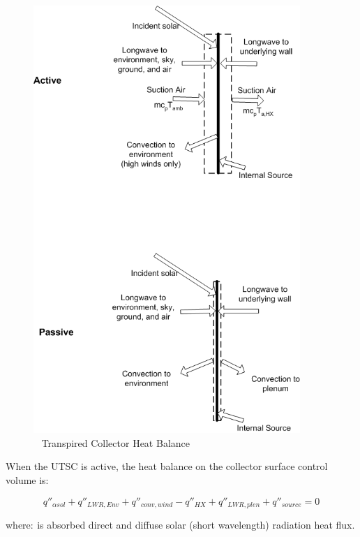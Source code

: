 \begin{figure}[hbtp] %
\centering
\includegraphics[width=0.9\textwidth, height=0.9\textheight, keepaspectratio=true]{media/image6620.png}
\caption{  Transpired Collector Heat Balance \protect \label{fig:transpired-collector-heat-balance}}
\end{figure}

When the UTSC is active, the heat balance on the collector surface control volume is:

\begin{equation}
{q''_{\alpha sol}} + {q''_{LWR,Env}} + {q''_{conv,wind}} - {q''_{HX}} + {q''_{LWR,plen}} + {q''_{source}} = 0
\end{equation}

where: \(_{ }\)is absorbed direct and diffuse solar (short wavelength) radiation heat flux.

